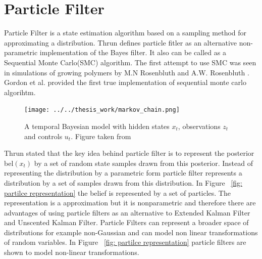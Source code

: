 \documentclass[12pt,draft]{dalcsthesis}
\begin{document}
\section{Particle Filter}
Particle Filter is a state estimation algorithm based on a sampling method for approximating a distribution. Thrun \cite{thrun2005probabilistic} defines particle fitler as an alternative non-parametric implementation of the Bayes filter. It also can be called as a Sequential Monte Carlo(SMC) algorithm. The first attempt to use SMC was seen in simulations of growing polymers by M.N Rosenbluth and A.W. Rosenbluth \cite{rosenbluth1955monte}. Gordon et al. \cite{gordon1993novel} provided the first true implementation of sequential monte carlo algorihtm. 

\begin{figure}
  \centering
     {\texttt{[image: ../../thesis\_work/markov\_chain.png]}}
  \caption{\label{fig-Markov Chain} A temporal Bayesian model with hidden states $x_{t}$, observations $z_{t}$ and controls $u_{t}$. Figure taken from \cite{thrun2005probabilistic}}
\end{figure}

Thrun \cite{thrun2005probabilistic} stated that the key idea behind particle filter is to represent the posterior bel$(x_{t})$ by a set of random state samples drawn from this posterior. Instead of representing the distribution by a parametric form particle filter represents a distribution by a set of samples drawn from this distribution. In Figure ~\ref{fig: partilce representation} the belief is represented by a set of particles. The representation is a approximation but it is nonparametric and therefore there are advantages of using particle filters as an alternative to Extended Kalman Filter and Unscented Kalman Filter. Particle Filters can represent a broader space of distributions for example non-Gaussian and can model non linear transformations of random variables. In Figure ~\ref{fig: partilce representation} particle filters are shown to model non-linear transformations. 
\end{document}
